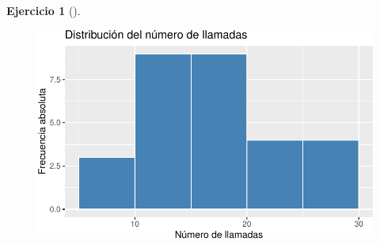 \documentclass[
  a4paper,
]{scrreport}
\theoremstyle{definition}
\newtheorem{exercise}{Ejercicio}[chapter]
\theoremstyle{remark}
\begin{document}
\begin{exercise}[]
\begin{tcolorbox}
\begin{figure}[H]

{\centering \includegraphics{./03-frecuencias-graficos_files/figure-pdf/unnamed-chunk-19-1.pdf}

}

\end{figure}

\end{tcolorbox}

\end{exercise}
\end{document}
